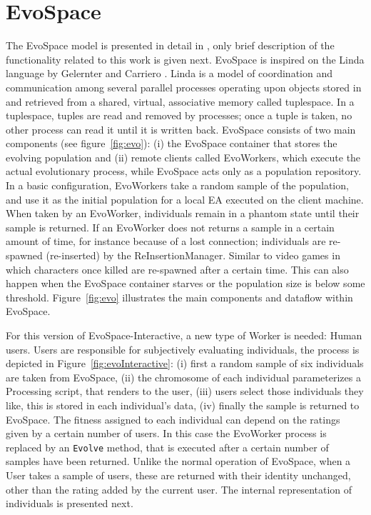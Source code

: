 \documentclass{sig-alternate}
\begin{document}
\section{EvoSpace}
\label{sec:evospace}
The EvoSpace model is presented in detail in \cite{EvoSpace}, only brief description of the functionality related to this work is given next.  EvoSpace is inspired on the Linda language by Gelernter and Carriero \cite{linda}. Linda is a model of coordination and communication among several parallel processes operating upon objects stored in and retrieved from a shared, virtual, associative memory called tuplespace. In a tuplespace, tuples are read and removed by processes; once a tuple is taken, no other process can read it until it is written back. EvoSpace consists of two main components (see figure~\ref{fig:evo}): (i) the EvoSpace container
that stores the evolving population and (ii) remote clients called EvoWorkers, which execute the actual evolutionary process, while EvoSpace acts only as a population repository. In a basic configuration, EvoWorkers take a random sample of the population, and use it as the initial population for a local EA executed on the client machine. When taken by an EvoWorker, individuals  remain in a phantom state until their sample is returned. If an EvoWorker does not returns a sample in a certain amount of time, for instance because of a lost connection; individuals are re-spawned (re-inserted) by the ReInsertionManager. Similar to video games in which characters once killed are re-spawned after a certain time. This can also happen when the EvoSpace container starves or the population size is below some threshold. Figure~\ref{fig:evo} illustrates the main components and dataflow within EvoSpace.

For this version of EvoSpace-Interactive, a new type of Worker is needed: Human users. Users are responsible for subjectively evaluating individuals, the process is depicted in Figure~\ref{fig:evoInteractive}: (i) first a random sample of six individuals are taken from EvoSpace, (ii) the chromosome of each individual parameterizes a Processing script, that renders to the user, (iii) users select those individuals they like, this is stored in each individual's data, (iv) finally the sample is returned to EvoSpace. The fitness assigned to each individual can depend on the ratings given by a certain number of users. In this case the EvoWorker process is replaced  by an \texttt{Evolve} method, that is executed after a certain number of samples have been returned.
Unlike the normal operation of EvoSpace, when a User takes a sample of users, these are returned with their identity unchanged, other than the rating added by the current user. The internal representation of individuals is presented next.
\end{document}
